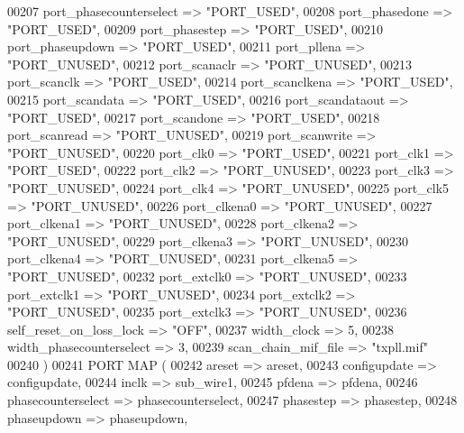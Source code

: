 \begin{DoxyCode}
{00207         port\_phasecounterselect => \textcolor{keyword}{"PORT\_USED"},
00208         port\_phasedone => \textcolor{keyword}{"PORT\_USED"},
00209         port\_phasestep => \textcolor{keyword}{"PORT\_USED"},
00210         port\_phaseupdown => \textcolor{keyword}{"PORT\_USED"},
00211         port\_pllena => \textcolor{keyword}{"PORT\_UNUSED"},
00212         port\_scanaclr => \textcolor{keyword}{"PORT\_UNUSED"},
00213         port\_scanclk => \textcolor{keyword}{"PORT\_USED"},
00214         port\_scanclkena => \textcolor{keyword}{"PORT\_USED"},
00215         port\_scandata => \textcolor{keyword}{"PORT\_USED"},
00216         port\_scandataout => \textcolor{keyword}{"PORT\_USED"},
00217         port\_scandone => \textcolor{keyword}{"PORT\_USED"},
00218         port\_scanread => \textcolor{keyword}{"PORT\_UNUSED"},
00219         port\_scanwrite => \textcolor{keyword}{"PORT\_UNUSED"},
00220         port\_clk0 => \textcolor{keyword}{"PORT\_USED"},
00221         port\_clk1 => \textcolor{keyword}{"PORT\_USED"},
00222         port\_clk2 => \textcolor{keyword}{"PORT\_UNUSED"},
00223         port\_clk3 => \textcolor{keyword}{"PORT\_UNUSED"},
00224         port\_clk4 => \textcolor{keyword}{"PORT\_UNUSED"},
00225         port\_clk5 => \textcolor{keyword}{"PORT\_UNUSED"},
00226         port\_clkena0 => \textcolor{keyword}{"PORT\_UNUSED"},
00227         port\_clkena1 => \textcolor{keyword}{"PORT\_UNUSED"},
00228         port\_clkena2 => \textcolor{keyword}{"PORT\_UNUSED"},
00229         port\_clkena3 => \textcolor{keyword}{"PORT\_UNUSED"},
00230         port\_clkena4 => \textcolor{keyword}{"PORT\_UNUSED"},
00231         port\_clkena5 => \textcolor{keyword}{"PORT\_UNUSED"},
00232         port\_extclk0 => \textcolor{keyword}{"PORT\_UNUSED"},
00233         port\_extclk1 => \textcolor{keyword}{"PORT\_UNUSED"},
00234         port\_extclk2 => \textcolor{keyword}{"PORT\_UNUSED"},
00235         port\_extclk3 => \textcolor{keyword}{"PORT\_UNUSED"},
00236         self\_reset\_on\_loss\_lock => \textcolor{keyword}{"OFF"},
00237         width\_clock => \textcolor{vhdllogic}{5},
00238         width\_phasecounterselect => \textcolor{vhdllogic}{3},
00239         scan\_chain\_mif\_file => \textcolor{keyword}{"txpll.mif"}
00240     \textcolor{vhdlchar}{)}
00241     \textcolor{keywordflow}{PORT} \textcolor{keywordflow}{MAP} (
00242         areset => areset,
00243         configupdate => configupdate,
00244         inclk => sub_wire1,
00245         pfdena => pfdena,
00246         phasecounterselect => phasecounterselect,
00247         phasestep => phasestep,
00248         phaseupdown => phaseupdown,
}
\end{DoxyCode}
